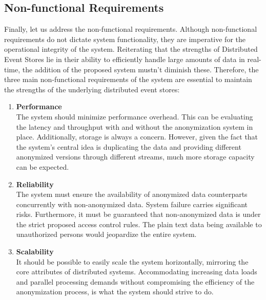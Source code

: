 \subsection{Non-functional Requirements}
Finally, let us address the non-functional requirements. Although non-functional requirements do not dictate system functionality, they are imperative for the operational integrity of the system. Reiterating that the strengths of Distributed Event Stores lie in their ability to efficiently handle large amounts of data in real-time, the addition of the proposed system mustn't diminish these. Therefore, the three main non-functional requirements of the system are essential to maintain the strengths of the underlying distributed event stores: 

\begin{enumerate}
    \item \textbf{Performance}\\ The system should minimize performance overhead. This can be evaluating the latency and throughput with and without the anonymization system in place. Additionally, storage is always a concern. However, given the fact that the system's central idea is duplicating the data and providing different anonymized versions through different streams, much more storage capacity can be expected. 
    \item \textbf{Reliability}\\ The system must ensure the availability of anonymized data counterparts concurrently with non-anonymized data. System failure carries significant risks. Furthermore, it must be guaranteed that non-anonymized data is under the strict proposed access control rules. The plain text data being available to unauthorized persons would jeopardize the entire system. 
    \item \textbf{Scalability}\\ It should be possible to easily scale the system horizontally, mirroring the core attributes of distributed systems. Accommodating increasing data loads and parallel processing demands without compromising the efficiency of the anonymization process, is what the system should strive to do.
\end{enumerate}

